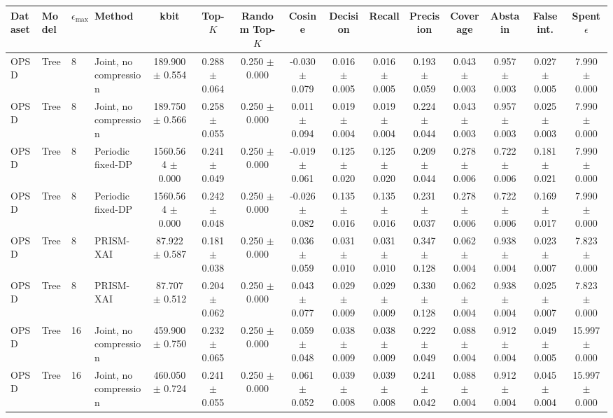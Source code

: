 \begin{tabular}{llllccccccccccc}
\toprule
Dataset & Model & $\epsilon_{\max}$ & Method & kbit & Top-$K$ & Random Top-$K$ & Cosine & Decision & Recall & Precision & Coverage & Abstain & False int. & Spent $\epsilon$ \\
\midrule
OPSD & Tree & 8 & Joint, no compression & 189.900 $\pm$ 0.554 & 0.288 $\pm$ 0.064 & 0.250 $\pm$ 0.000 & -0.030 $\pm$ 0.079 & 0.016 $\pm$ 0.005 & 0.016 $\pm$ 0.005 & 0.193 $\pm$ 0.059 & 0.043 $\pm$ 0.003 & 0.957 $\pm$ 0.003 & 0.027 $\pm$ 0.005 & 7.990 $\pm$ 0.000 \\
OPSD & Tree & 8 & Joint, no compression & 189.750 $\pm$ 0.566 & 0.258 $\pm$ 0.055 & 0.250 $\pm$ 0.000 & 0.011 $\pm$ 0.094 & 0.019 $\pm$ 0.004 & 0.019 $\pm$ 0.004 & 0.224 $\pm$ 0.044 & 0.043 $\pm$ 0.003 & 0.957 $\pm$ 0.003 & 0.025 $\pm$ 0.003 & 7.990 $\pm$ 0.000 \\
OPSD & Tree & 8 & Periodic fixed-DP & 1560.564 $\pm$ 0.000 & 0.241 $\pm$ 0.049 & 0.250 $\pm$ 0.000 & -0.019 $\pm$ 0.061 & 0.125 $\pm$ 0.020 & 0.125 $\pm$ 0.020 & 0.209 $\pm$ 0.044 & 0.278 $\pm$ 0.006 & 0.722 $\pm$ 0.006 & 0.181 $\pm$ 0.021 & 7.990 $\pm$ 0.000 \\
OPSD & Tree & 8 & Periodic fixed-DP & 1560.564 $\pm$ 0.000 & 0.242 $\pm$ 0.048 & 0.250 $\pm$ 0.000 & -0.026 $\pm$ 0.082 & 0.135 $\pm$ 0.016 & 0.135 $\pm$ 0.016 & 0.231 $\pm$ 0.037 & 0.278 $\pm$ 0.006 & 0.722 $\pm$ 0.006 & 0.169 $\pm$ 0.017 & 7.990 $\pm$ 0.000 \\
OPSD & Tree & 8 & PRISM-XAI & 87.922 $\pm$ 0.587 & 0.181 $\pm$ 0.038 & 0.250 $\pm$ 0.000 & 0.036 $\pm$ 0.059 & 0.031 $\pm$ 0.010 & 0.031 $\pm$ 0.010 & 0.347 $\pm$ 0.128 & 0.062 $\pm$ 0.004 & 0.938 $\pm$ 0.004 & 0.023 $\pm$ 0.007 & 7.823 $\pm$ 0.000 \\
OPSD & Tree & 8 & PRISM-XAI & 87.707 $\pm$ 0.512 & 0.204 $\pm$ 0.062 & 0.250 $\pm$ 0.000 & 0.043 $\pm$ 0.077 & 0.029 $\pm$ 0.009 & 0.029 $\pm$ 0.009 & 0.330 $\pm$ 0.128 & 0.062 $\pm$ 0.004 & 0.938 $\pm$ 0.004 & 0.025 $\pm$ 0.007 & 7.823 $\pm$ 0.000 \\
OPSD & Tree & 16 & Joint, no compression & 459.900 $\pm$ 0.750 & 0.232 $\pm$ 0.065 & 0.250 $\pm$ 0.000 & 0.059 $\pm$ 0.048 & 0.038 $\pm$ 0.009 & 0.038 $\pm$ 0.009 & 0.222 $\pm$ 0.049 & 0.088 $\pm$ 0.004 & 0.912 $\pm$ 0.004 & 0.049 $\pm$ 0.005 & 15.997 $\pm$ 0.000 \\
OPSD & Tree & 16 & Joint, no compression & 460.050 $\pm$ 0.724 & 0.241 $\pm$ 0.055 & 0.250 $\pm$ 0.000 & 0.061 $\pm$ 0.052 & 0.039 $\pm$ 0.008 & 0.039 $\pm$ 0.008 & 0.241 $\pm$ 0.042 & 0.088 $\pm$ 0.004 & 0.912 $\pm$ 0.004 & 0.045 $\pm$ 0.004 & 15.997 $\pm$ 0.000 \\

\end{tabular}
